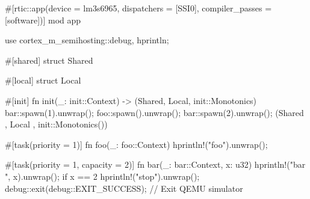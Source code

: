 #[rtic::app(device = lm3s6965, dispatchers = [SSI0], compiler_passes = [software])]
mod app {
    use cortex_m_semihosting::{debug, hprintln};

    #[shared]
    struct Shared {}

    #[local]
    struct Local {}

    #[init]
    fn init(_: init::Context) -> (Shared, Local, init::Monotonics) {
        bar::spawn(1).unwrap();
        foo::spawn().unwrap();
        bar::spawn(2).unwrap();
        (Shared {}, Local {}, init::Monotonics())
    }

    #[task(priority = 1)]
    fn foo(_: foo::Context) {
        hprintln!("foo").unwrap();
    } 
    
    #[task(priority = 1, capacity = 2)]
    fn bar(_: bar::Context, x: u32) {
        hprintln!("bar {}", x).unwrap();
        if x == 2{
            hprintln!("stop").unwrap();
            debug::exit(debug::EXIT_SUCCESS); // Exit QEMU simulator
        }
    }
}
